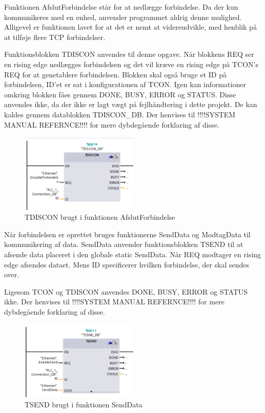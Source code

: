 Funktionen AfslutForbindelse står for at nedlægge forbindelse. Da der kun kommunikeres med en enhed, anvender programmet aldrig denne mulighed. Alligevel er funktionen lavet for at det er nemt at videreudvikle, med henblik på at tilføje flere TCP forbindelser. 

Funktionsblokken TDISCON anvendes til denne opgave. Når blokkens REQ ser en rising edge nedlægges forbindelsen og det vil kræve en rising edge på TCON's REQ for at genetablere forbindelsen. Blokken skal også bruge et ID på forbindelsen, ID'et er sat i konfigurationen af TCON. Igen kan informationer omkring blokken fåes gennem DONE, BUSY, ERROR og STATUS. Disse anvendes ikke, da der ikke er lagt vægt på fejlhåndtering i dette projekt. De kan kaldes gennem datablokken TDISCON\_DB. Der henvises til !!!!SYSTEM MANUAL REFERNCE!!!! for mere dybdegående forklaring af disse.

\begin{figure}[H] %
	\centering
	\includegraphics[width=0.5\textwidth]{Figure/TDISCON}
	\caption{TDISCON brugt i funktionen AfslutForbindelse}
	\label{fig:TDISCON}
\end{figure}

Når forbindelsen er oprettet bruges funktionerne SendData og ModtagData til  kommunikering af data. SendData anvender funktionsblokken TSEND til at afsende data placeret i den globale static SendData. Når REQ modtager en rising edge afsendes dataet. Mens ID specificerer hvilken forbindelse, der skal sendes over.

Ligesom TCON og TDISCON anvendes DONE, BUSY, ERROR og STATUS ikke. Der henvises til !!!!SYSTEM MANUAL REFERNCE!!!! for mere dybdegående forklaring af disse.

\begin{figure}[H] %
	\centering
	\includegraphics[width=0.5\textwidth]{Figure/TSEND}
	\caption{TSEND brugt i funktionen SendData}
	\label{fig:TSEND}
\end{figure}

